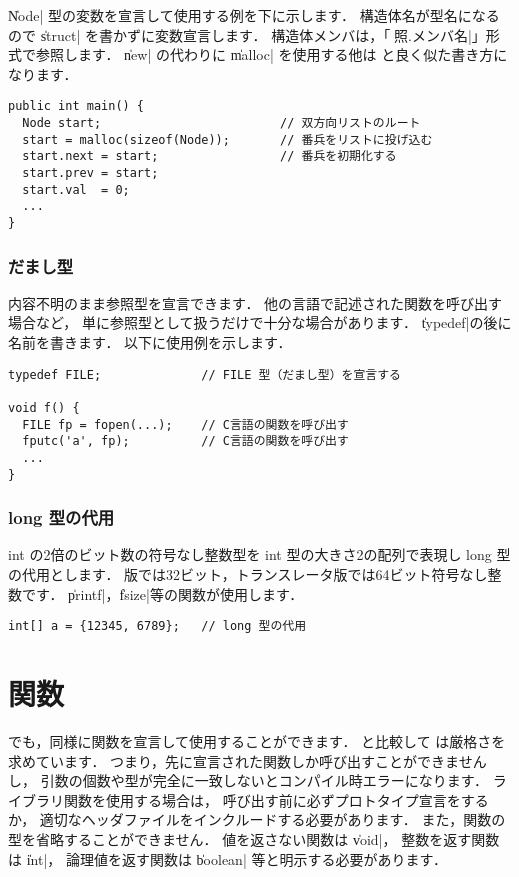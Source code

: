 \|Node| 型の変数を宣言して使用する例を下に示します．
構造体名が型名になるので \|struct| を書かずに変数宣言します．
構造体メンバは，「\|参照.メンバ名|」形式で参照します．
\|new| の代わりに \|malloc| を使用する他は
\javal と良く似た書き方になります．

\begin{mylist}
\begin{verbatim}
public int main() {
  Node start;                         // 双方向リストのルート
  start = malloc(sizeof(Node));       // 番兵をリストに投げ込む
  start.next = start;                 // 番兵を初期化する
  start.prev = start;
  start.val  = 0;
  ...
}
\end{verbatim}
\end{mylist}

\subsubsection{だまし型}

内容不明のまま参照型を宣言できます．
他の言語で記述された関数を呼び出す場合など，
単に参照型として扱うだけで十分な場合があります．
\|typedef|の後に名前を書きます．
以下に使用例を示します．

\begin{mylist}
\begin{verbatim}
typedef FILE;              // FILE 型（だまし型）を宣言する

void f() {
  FILE fp = fopen(...);    // C言語の関数を呼び出す
  fputc('a', fp);          // C言語の関数を呼び出す
  ...
}
\end{verbatim}
\end{mylist}

\subsubsection{long 型の代用}

int の2倍のビット数の符号なし整数型を
int 型の大きさ2の配列で表現し long 型の代用とします．
{\tac}版では32ビット，トランスレータ版では64ビット符号なし整数です．
\|printf|，\|fsize|等の関数が使用します．

\begin{mylist}
\begin{verbatim}
int[] a = {12345, 6789};   // long 型の代用
\end{verbatim}
\end{mylist}



\section{関数}
\label{chap3:func}
\cmml でも，\cl 同様に関数を宣言して使用することができます．
\cl と比較して \cmml は厳格さを求めています．
つまり，先に宣言された関数しか呼び出すことができませんし，
引数の個数や型が完全に一致しないとコンパイル時エラーになります．
ライブラリ関数を使用する場合は，
呼び出す前に必ずプロトタイプ宣言をするか，
適切なヘッダファイルをインクルードする必要があります．
また，関数の型を省略することができません．
値を返さない関数は \|void|，
整数を返す関数は \|int|，
論理値を返す関数は \|boolean| 等と明示する必要があります．

